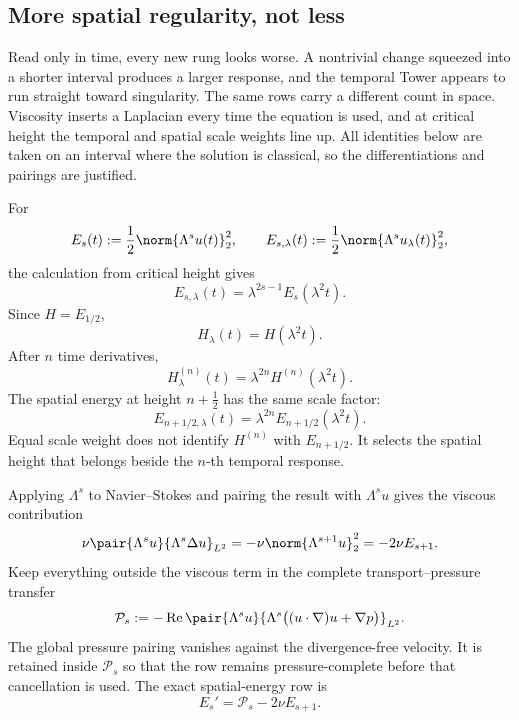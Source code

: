 \subsection{More spatial regularity, not less}\label{sub:ThePressureCompleteMixedDerivativeTower}

Read only in time, every new rung looks worse.
A nontrivial change squeezed into a shorter interval produces a larger response, and the temporal Tower appears to run straight toward singularity.
The same rows carry a different count in space.
Viscosity inserts a Laplacian every time the equation is used, and at critical height the temporal and spatial scale weights line up.
All identities below are taken on an interval where the solution is classical, so the differentiations and pairings are justified.

For
\[
  E_s(t):=\frac12\norm{\Lambda^su(t)}_2^2,
  \qquad
  E_{s,\lambda}(t):=\frac12\norm{\Lambda^su_\lambda(t)}_2^2,
\]
the calculation from critical height gives
\begin{equation}\label{eq:BodySpatialEnergyScaling}
  E_{s,\lambda}(t)
  =\lambda^{2s-1}E_s(\lambda^2t).
\end{equation}
Since \(H=E_{1/2}\),
\[
  H_\lambda(t)=H(\lambda^2t).
\]
After \(n\) time derivatives,
\begin{equation}\label{eq:BodyCriticalHeightTemporalScaling}
  H_\lambda^{(n)}(t)
  =\lambda^{2n}H^{(n)}(\lambda^2t).
\end{equation}
The spatial energy at height \(n+\tfrac12\) has the same scale factor:
\begin{equation}\label{eq:BodySpatialHeightScalingDiagonal}
  E_{n+1/2,\lambda}(t)
  =\lambda^{2n}E_{n+1/2}(\lambda^2t).
\end{equation}
Equal scale weight does not identify \(H^{(n)}\) with \(E_{n+1/2}\).
It selects the spatial height that belongs beside the \(n\)-th temporal response.

Applying \(\Lambda^s\) to Navier--Stokes and pairing the result with \(\Lambda^su\) gives the viscous contribution
\[
  \nu\pair{\Lambda^su}{\Lambda^s\Delta u}_{L^2}
  =-\nu\norm{\Lambda^{s+1}u}_2^2
  =-2\nu E_{s+1}.
\]
Keep everything outside the viscous term in the complete transport--pressure transfer
\[
  \mathcal P_s
  :=-
  \operatorname{Re}
  \pair{\Lambda^su}
  {\Lambda^s\bigl((u\cdot\nabla)u+\nabla p\bigr)}_{L^2}.
\]
The global pressure pairing vanishes against the divergence-free velocity.
It is retained inside \(\mathcal P_s\) so that the row remains pressure-complete before that cancellation is used.
The exact spatial-energy row is
\begin{equation}\label{eq:BodyCriticalEnergyBalance}
  E_s'=\mathcal P_s-2\nu E_{s+1}.
\end{equation}


